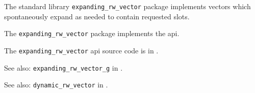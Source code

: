 
The standard library {\tt expanding\_rw\_vector} package implements vectors which 
spontaneously expand as needed to contain requested slots.

The {\tt expanding\_rw\_vector} package implements the  api.


The {\tt expanding\_rw\_vector} api source code is in .


See also:  {\tt expanding\_rw\_vector\_g} in .

See also:  {\tt dynamic\_rw\_vector} in .
